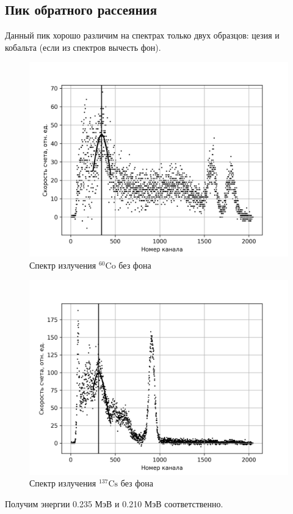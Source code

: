 \documentclass[14pt, a4paper]{report}
\begin{document}
\subsection{Пик обратного рассеяния}

Данный пик хорошо различим на спектрах только двух образцов: цезия и кобальта (если из спектров вычесть фон).

\begin{figure}[H]
\centering
\includegraphics[width=.7\textwidth]{../images/555-co60bs}
\caption{Спектр излучения $^{60}\text{Co}$ без фона}
\end{figure}

\begin{figure}[H]
\centering
\includegraphics[width=.7\textwidth]{../images/555-cs137bs}
\caption{Спектр излучения $^{137}\text{Cs}$ без фона}
\end{figure}

Получим энергии 0.235 МэВ и 0.210 МэВ соответственно.
\end{document}
